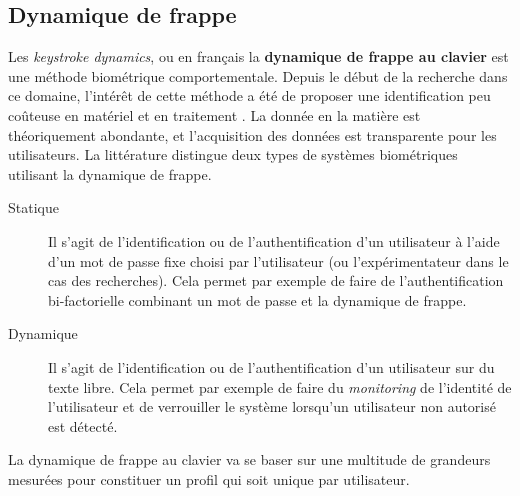 \subsection{Dynamique de frappe}

Les \textit{keystroke dynamics}, ou en français la \textbf{dynamique de frappe au clavier} est une méthode biométrique comportementale. Depuis le début de la recherche dans ce domaine\cite{rand}, l'intérêt de cette méthode a été de proposer une identification peu coûteuse en matériel et en traitement \cite{monrose1997}. La donnée en la matière est théoriquement abondante, et l'acquisition des données est transparente pour les utilisateurs. La littérature distingue deux types de systèmes biométriques utilisant la dynamique de frappe.\\

%
%

\begin{description}
  \item[Statique] Il s'agit de l'identification ou de l'authentification d'un utilisateur à l'aide d'un mot de passe fixe choisi par l'utilisateur (ou l'expérimentateur dans le cas des recherches). Cela permet par exemple de faire de l'authentification bi-factorielle combinant un mot de passe et la dynamique de frappe.
  \item[Dynamique] Il s'agit de l'identification ou de l'authentification d'un utilisateur sur du texte libre. Cela permet par exemple de faire du \textit{monitoring} de l'identité de l'utilisateur et de verrouiller le système lorsqu'un utilisateur non autorisé est détecté.\\
\end{description}

La dynamique de frappe au clavier va se baser sur une multitude de grandeurs mesurées pour constituer un profil qui soit unique par utilisateur\cite{giotThese,Hu2008,gunetti2005,bergadano2002}.
